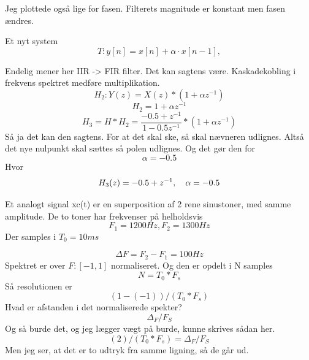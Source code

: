 \begin{EksamensOpgaver}
\begin{Eksamenssæt}
\begin{eksamensOpgave}
\begin{UnderOpgave}
            \end{UnderOpgave}
            \begin{UnderOpgave}[Skitser magnituden evalueret i $z=e^{j\omega}$]
                Jeg plottede også lige for fasen. Filterets magnitude er konstant men fasen ændres.
            \end{UnderOpgave}
            Et nyt system 
            \[T\colon y[n]=x[n]+\alpha\cdot x[n - 1],\]
            \begin{UnderOpgave}
                Endelig mener her IIR -> FIR filter. 
                Det kan sagtens være. Kaskadekobling i frekvens spektret medføre multiplikation. 
                \[H_2 : Y(z) = X(z)*(1 + \alpha z^{-1})\]
                \[H_2 = 1 + \alpha z^{-1}\]
                \[H_3 = H * H_2 = \frac{-0.5 + z^{-1}}{1 - 0.5z^{-1}} * (1 + \alpha z^{-1})\]
                Så ja det kan den sagtens. For at det skal ske, så skal nævneren udlignes. Altså det nye nulpunkt skal sættes så polen udlignes. 
                Og det gør den for
                \[\alpha = -0.5\]
                Hvor 
                \[H_3(z) = -0.5 + z^{-1}, \tab{0} \alpha = -0.5\]
            \end{UnderOpgave}
        \end{eksamensOpgave}

        \begin{eksamensOpgave}
            Et analogt signal xc(t) er en superposition af 2 rene sinustoner, med samme amplitude. De to toner har frekvenser på helholdsvis 
            \[F_1 = 1200Hz, F_2 = 1300Hz\]
            Der samples i $T_0 = 10ms$
            \begin{UnderOpgave}
                \[\Delta F = F_2 - F_1 = 100Hz\]
                Spektret er over $F: [-1, 1]$ normaliseret. 
                Og den er opdelt i N samples 
                \[N = T_0 * F_s\]
                Så resolutionen er 
                \[(1 - (-1))/(T_0 * F_s)\]
                Hvad er afstanden i det normaliserede spekter? 
                \[\Delta_F/F_S\] 
                Og så burde det, og jeg lægger vægt på burde, kunne skrives sådan her.
                \[(2)/(T_0 * F_s) = \Delta_F/F_S\]
                Men jeg ser, at det er to udtryk fra samme ligning, så de går ud. 
                

\end{UnderOpgave}
\end{eksamensOpgave}
\end{Eksamenssæt}
\end{EksamensOpgaver}
